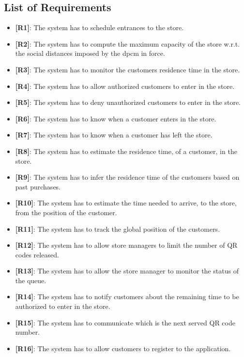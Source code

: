 \subsection{List of Requirements}

\begin{itemize}

    \item {\textbf{[R1]}}: The system has to schedule entrances to the store.
    \item {\textbf{[R2]}}: The system has to compute the maximum capacity of the store w.r.t. the social distances imposed by the \gls{dpcm} in force.
    \item {\textbf{[R3]}}: The system has to monitor the customers residence time in the store.
    \item {\textbf{[R4]}}: The system has to allow authorized customers to enter in the store.
    \item {\textbf{[R5]}}: The system has to deny unauthorized customers to enter in the store.
    \item {\textbf{[R6]}}: The system has to know when a customer enters in the store.
    \item {\textbf{[R7]}}: The system has to know when a customer has left the store.
    \item {\textbf{[R8]}}: The system has to estimate the residence time, of a customer, in the store.
    \item {\textbf{[R9]}}: The system has to infer the residence time of the customers based on past purchases.
    \item {\textbf{[R10]}}: The system has to estimate the time needed to arrive, to the store, from the position of the customer.
    \item {\textbf{[R11]}}: The system has to track the global position of the customers.
    \item {\textbf{[R12]}}: The system has to allow store managers to limit the number of QR codes released.
    \item {\textbf{[R13]}}: The system has to allow the store manager to monitor the status of the queue.
    \item {\textbf{[R14]}}: The system has to notify customers about the remaining time to be authorized to enter in the store.
    \item {\textbf{[R15]}}: The system has to communicate which is the next served QR code number.
    \item {\textbf{[R16]}}: The system has to allow customers to register to the application.

\end{itemize}
